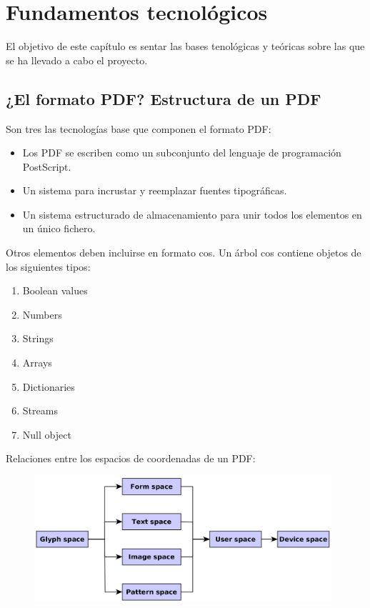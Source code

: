 
\chapter{Fundamentos tecnológicos}
\label{chap:fundamentos-tecnologicos}

El objetivo de este capítulo es sentar las bases tenológicas y teóricas sobre las que se ha llevado a cabo el proyecto.

\section{¿El formato PDF? Estructura de un PDF}

Son tres las tecnologías base que componen el formato PDF:

\begin{itemize}
	\item Los PDF se escriben como un subconjunto del lenguaje de programación PostScript.
	\item Un sistema para incrustar y reemplazar fuentes tipográficas.
	\item Un sistema estructurado de almacenamiento para unir todos los elementos en un único fichero.
\end{itemize}

Otros elementos deben incluirse en formato \acrfull{cos}. Un árbol cos contiene objetos de los siguientes tipos:

\begin{enumerate}
	\item Boolean values
	\item Numbers
	\item Strings
	\item Arrays
	\item Dictionaries
	\item Streams
	\item Null object
\end{enumerate}

Relaciones entre los espacios de coordenadas de un PDF:

\begin{figure}[hp!]
	\centering
	\includegraphics[width=11cm]{imaxes/espacios-coordenadas.png}
\end{figure}

